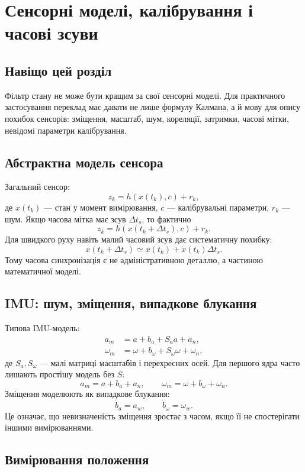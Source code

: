 
\chapter{Сенсорні моделі, калібрування і часові зсуви}

\section{Навіщо цей розділ}

Фільтр стану не може бути кращим за свої сенсорні моделі. Для практичного застосування переклад має давати не лише формулу Калмана, а й мову для опису похибок сенсорів: зміщення, масштаб, шум, кореляції, затримки, часові мітки, невідомі параметри калібрування.

\section{Абстрактна модель сенсора}

Загальний сенсор:
\[
z_k = h(x(t_k), c) + r_k,
\]
де $x(t_k)$ --- стан у момент вимірювання, $c$ --- калібрувальні параметри, $r_k$ --- шум. Якщо часова мітка має зсув $\Delta t_s$, то фактично
\[
z_k = h(x(t_k+\Delta t_s), c)+r_k.
\]
Для швидкого руху навіть малий часовий зсув дає систематичну похибку:
\[
x(t_k+\Delta t_s) \simeq x(t_k) + \dot x(t_k)\Delta t_s.
\]
Тому часова синхронізація є не адміністративною деталлю, а частиною математичної моделі.

\section{IMU: шум, зміщення, випадкове блукання}

Типова IMU-модель:
\begin{align}
a_m &= a + b_a + S_a a + a_n,\\
\omega_m &= \omega + b_\omega + S_\omega\omega + \omega_n,
\end{align}
де $S_a,S_\omega$ --- малі матриці масштабів і перехресних осей. Для першого ядра часто лишають простішу модель без $S$:
\[
a_m = a + b_a + a_n,\qquad \omega_m=\omega+b_\omega+\omega_n.
\]
Зміщення моделюють як випадкове блукання:
\[
\dot b_a = a_w,\qquad \dot b_\omega=\omega_w.
\]
Це означає, що невизначеність зміщення зростає з часом, якщо її не спостерігати іншими вимірюваннями.

\section{Вимірювання положення}


